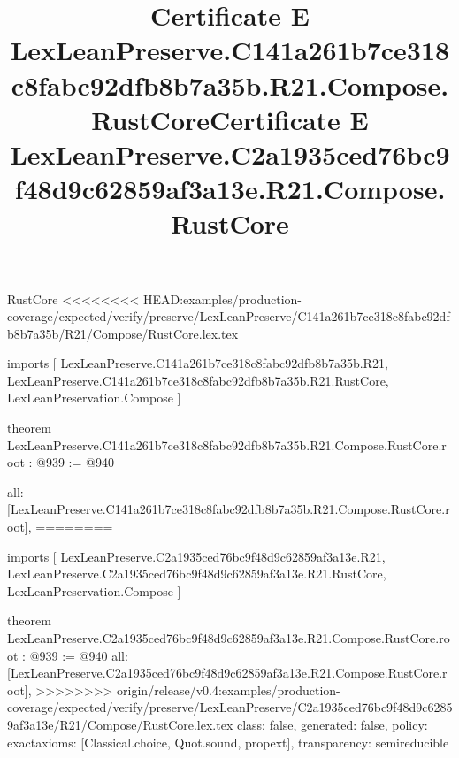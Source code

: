 \begin{lexlean}{RustCore}
<<<<<<<< HEAD:examples/production-coverage/expected/verify/preserve/LexLeanPreserve/C141a261b7ce318c8fabc92dfb8b7a35b/R21/Compose/RustCore.lex.tex
\title{Certificate E LexLeanPreserve.C141a261b7ce318c8fabc92dfb8b7a35b.R21.Compose.RustCore}
\begin{coremodule}
imports [
  LexLeanPreserve.C141a261b7ce318c8fabc92dfb8b7a35b.R21,
  LexLeanPreserve.C141a261b7ce318c8fabc92dfb8b7a35b.R21.RustCore,
  LexLeanPreservation.Compose
]

theorem LexLeanPreserve.C141a261b7ce318c8fabc92dfb8b7a35b.R21.Compose.RustCore.root : @939 := @940 {
  all: [LexLeanPreserve.C141a261b7ce318c8fabc92dfb8b7a35b.R21.Compose.RustCore.root],
========
\title{Certificate E LexLeanPreserve.C2a1935ced76bc9f48d9c62859af3a13e.R21.Compose.RustCore}
\begin{coremodule}
imports [
  LexLeanPreserve.C2a1935ced76bc9f48d9c62859af3a13e.R21,
  LexLeanPreserve.C2a1935ced76bc9f48d9c62859af3a13e.R21.RustCore,
  LexLeanPreservation.Compose
]

theorem LexLeanPreserve.C2a1935ced76bc9f48d9c62859af3a13e.R21.Compose.RustCore.root : @939 := @940 {
  all: [LexLeanPreserve.C2a1935ced76bc9f48d9c62859af3a13e.R21.Compose.RustCore.root],
>>>>>>>> origin/release/v0.4:examples/production-coverage/expected/verify/preserve/LexLeanPreserve/C2a1935ced76bc9f48d9c62859af3a13e/R21/Compose/RustCore.lex.tex
  class: false,
  generated: false,
  policy: exact{axioms: [Classical.choice, Quot.sound, propext]},
  transparency: semireducible
}


\end{coremodule}}
\end{coremodule}
\end{lexlean}
